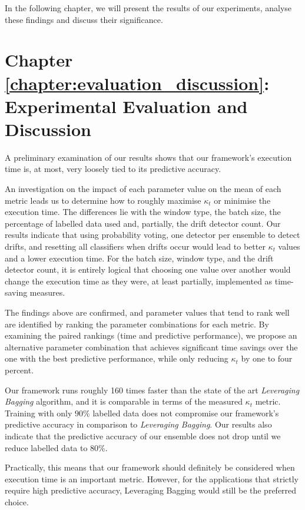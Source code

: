 In the following chapter, we will present the results of our experiments, analyse these findings and discuss their significance.

\section{Chapter \ref{chapter:evaluation_discussion}: Experimental Evaluation and Discussion}
A preliminary examination of our results shows that our framework's execution time is, at most, very loosely tied to its predictive accuracy.

An investigation on the impact of each parameter value on the mean of each metric leads us to determine how to roughly maximise $\kappa_t$ or minimise the execution time.
The differences lie with the window type, the batch size, the percentage of labelled data used and, partially, the drift detector count. Our results indicate that using probability voting, one detector per ensemble to detect drifts, and resetting all classifiers when drifts occur would lead to better $\kappa_t$ values and a lower execution time. For the batch size, window type, and the drift detector count, it is entirely logical that choosing one value over another would change the execution time as they were, at least partially, implemented as time-saving measures.

The findings above are confirmed, and parameter values that tend to rank well are identified by ranking the parameter combinations for each metric. By examining the paired rankings (time and predictive performance), we propose an alternative parameter combination that achieves significant time savings over the one with the best predictive performance, while only reducing $\kappa_t$ by one to four percent.

Our framework runs roughly 160 times faster than the state of the art \textit{Leveraging Bagging} algorithm, and it is comparable in terms of the measured $\kappa_t$ metric. Training with only $90\%$ labelled data does not compromise our framework's predictive accuracy in comparison to \textit{Leveraging Bagging}. Our results also indicate that the predictive accuracy of our ensemble does not drop until we reduce labelled data to 80\%.

Practically, this means that our framework should definitely be considered when execution time is an important metric. However, for the applications that strictly require high predictive accuracy, Leveraging Bagging would still be the preferred choice.

